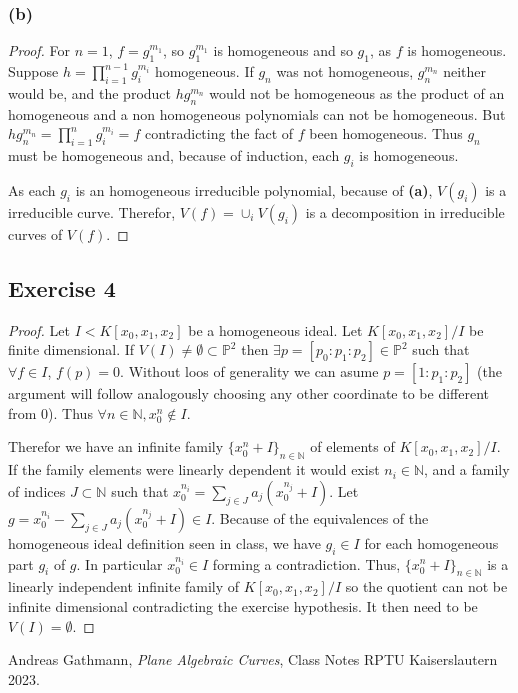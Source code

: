 \documentclass[11pt,a4paper]{article}
\begin{document}
\subsubsection*{(b)}
  \begin{proof}
    For $ n = 1 $, $ f = g_1^{m_1} $, so $ g_1^{m_1} $ is homogeneous and so $ g_1 $, as $ f $ is homogeneous. Suppose $ h = \prod_{i=1}^{n-1} g_i^{m_i} $ homogeneous. If $ g_n $ was not homogeneous, $ g_n^{m_n} $ neither would be, and the product $ h g_n^{m_n} $ would not be homogeneous as the product of an homogeneous and a non homogeneous polynomials can not be homogeneous. But $ h g_n^{m_n} = \prod_{i=1}^n g_i^{m_i} = f $ contradicting the fact of $ f $ been homogeneous. Thus $ g_n $ must be homogeneous and, because of induction, each $ g_i $ is homogeneous.

    \vspace{1mm}
    As each $ g_i $ is an homogeneous irreducible polynomial, because of {\bf (a)}, $ V(g_i) $ is a irreducible curve. Therefor, $ V(f) = \cup_i V(g_i) $ is a decomposition in irreducible curves of $ V(f) $.
  \end{proof}

\subsection*{Exercise 4}
\begin{proof}
  Let $ I < K[x_0, x_1, x_2] $ be a homogeneous ideal. Let $ K[x_0, x_1, x_2] / I $ be finite dimensional. If $ V(I) \neq \emptyset \subset \mathbb P^2 $ then $ \exists p = [p_0: p_1: p_2] \in \mathbb P^2 $ such that $ \forall f \in I $, $ f(p) = 0 $. Without loos of generality we can asume $ p = [1: p_1: p_2] $ (the argument will follow analogously choosing any other coordinate to be different from $ 0 $). Thus $ \forall n \in \mathbb N, x_0^n \notin I $. 

  \vspace{1mm}
  Therefor we have an infinite family $ \{ x_0^n + I \}_{n \in \mathbb N} $ of elements of $ K[x_0, x_1, x_2] / I $. If the family elements were linearly dependent it would exist $ n_i \in \mathbb N $, and a family of indices $ J \subset \mathbb N $ such that $ x_0^{n_i} = \sum_{j \in J} a_j (x_0^{n_j} + I) $. Let $ g = x_0^{n_i} - \sum_{j \in J} a_j (x_0^{n_j} + I) \in I $. Because of the equivalences of the homogeneous ideal definition seen in class, we have $ g_i \in I $ for each homogeneous part $ g_i $ of $ g $. In particular $ x_0^{n_i} \in I $ forming a contradiction. Thus, $ \{ x_0^n + I \}_{n \in \mathbb N} $ is a linearly independent infinite family of $ K[x_0, x_1, x_2] / I $ so the quotient can not be infinite dimensional contradicting the exercise hypothesis. It then need to be $ V(I) = \emptyset $.
\end{proof}


\begin{thebibliography}{9}

  Andreas Gathmann,
  \textit{Plane Algebraic Curves},
  Class Notes RPTU Kaiserslautern 2023.
  
\end{thebibliography}
\end{document}
